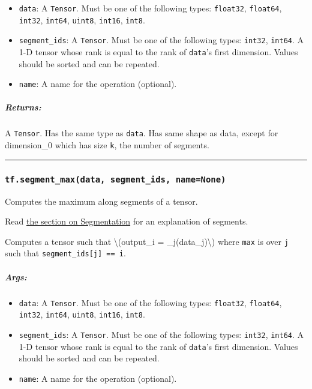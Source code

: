 \begin{itemize}
\tightlist
\item
  \texttt{data}: A \texttt{Tensor}. Must be one of the following types:
  \texttt{float32}, \texttt{float64}, \texttt{int32}, \texttt{int64},
  \texttt{uint8}, \texttt{int16}, \texttt{int8}.
\item
  \texttt{segment\_ids}: A \texttt{Tensor}. Must be one of the following
  types: \texttt{int32}, \texttt{int64}. A 1-D tensor whose rank is
  equal to the rank of \texttt{data}'s first dimension. Values should be
  sorted and can be repeated.
\item
  \texttt{name}: A name for the operation (optional).
\end{itemize}

\subparagraph{Returns: }\label{returns-48}

A \texttt{Tensor}. Has the same type as \texttt{data}. Has same shape as
data, except for dimension\_0 which has size \texttt{k}, the number of
segments.

\begin{center}\rule{0.5\linewidth}{\linethickness}\end{center}

\subsubsection{\texorpdfstring{\texttt{tf.segment\_max(data,\ segment\_ids,\ name=None)}
}{tf.segment\_max(data, segment\_ids, name=None) }}\label{tf.segmentux5fmaxdata-segmentux5fids-namenone}

Computes the maximum along segments of a tensor.

Read \href{../../api_docs/python/math_ops.md\#segmentation}{the section
on Segmentation} for an explanation of segments.

Computes a tensor such that \textbackslash{}(output\_i =
\max\_j(data\_j)\textbackslash{}) where \texttt{max} is over \texttt{j}
such that \texttt{segment\_ids{[}j{]}\ ==\ i}.

\subparagraph{Args: }\label{args-49}

\begin{itemize}
\tightlist
\item
  \texttt{data}: A \texttt{Tensor}. Must be one of the following types:
  \texttt{float32}, \texttt{float64}, \texttt{int32}, \texttt{int64},
  \texttt{uint8}, \texttt{int16}, \texttt{int8}.
\item
  \texttt{segment\_ids}: A \texttt{Tensor}. Must be one of the following
  types: \texttt{int32}, \texttt{int64}. A 1-D tensor whose rank is
  equal to the rank of \texttt{data}'s first dimension. Values should be
  sorted and can be repeated.
\item
  \texttt{name}: A name for the operation (optional).
\end{itemize}

